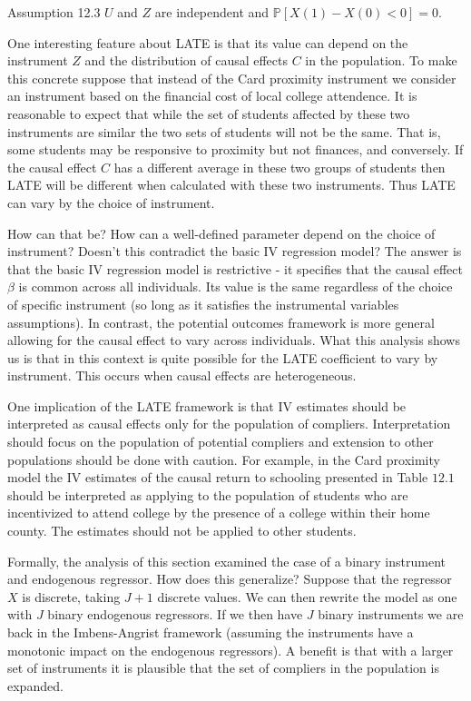 \documentclass[10pt]{article}
\begin{document}
Assumption 12.3 $U$ and $Z$ are independent and $\mathbb{P}[X(1)-X(0)<0]=0 .$

One interesting feature about LATE is that its value can depend on the instrument $Z$ and the distribution of causal effects $C$ in the population. To make this concrete suppose that instead of the Card proximity instrument we consider an instrument based on the financial cost of local college attendence. It is reasonable to expect that while the set of students affected by these two instruments are similar the two sets of students will not be the same. That is, some students may be responsive to proximity but not finances, and conversely. If the causal effect $C$ has a different average in these two groups of students then LATE will be different when calculated with these two instruments. Thus LATE can vary by the choice of instrument.

How can that be? How can a well-defined parameter depend on the choice of instrument? Doesn't this contradict the basic IV regression model? The answer is that the basic IV regression model is restrictive - it specifies that the causal effect $\beta$ is common across all individuals. Its value is the same regardless of the choice of specific instrument (so long as it satisfies the instrumental variables assumptions). In contrast, the potential outcomes framework is more general allowing for the causal effect to vary across individuals. What this analysis shows us is that in this context is quite possible for the LATE coefficient to vary by instrument. This occurs when causal effects are heterogeneous.

One implication of the LATE framework is that IV estimates should be interpreted as causal effects only for the population of compliers. Interpretation should focus on the population of potential compliers and extension to other populations should be done with caution. For example, in the Card proximity model the IV estimates of the causal return to schooling presented in Table $12.1$ should be interpreted as applying to the population of students who are incentivized to attend college by the presence of a college within their home county. The estimates should not be applied to other students.

Formally, the analysis of this section examined the case of a binary instrument and endogenous regressor. How does this generalize? Suppose that the regressor $X$ is discrete, taking $J+1$ discrete values. We can then rewrite the model as one with $J$ binary endogenous regressors. If we then have $J$ binary instruments we are back in the Imbens-Angrist framework (assuming the instruments have a monotonic impact on the endogenous regressors). A benefit is that with a larger set of instruments it is plausible that the set of compliers in the population is expanded.
\end{document}
